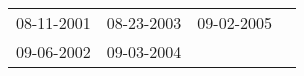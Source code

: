 \begin{supertabular}{llll}
 08-11-2001 &  08-23-2003 &  09-02-2005 \\
 09-06-2002 &  09-03-2004 &             \\
\end{supertabular}
